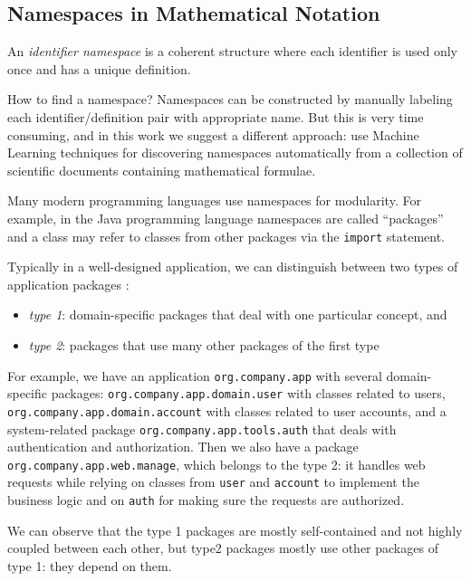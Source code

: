 \subsection{Namespaces in Mathematical Notation} \label{sec:namespaces}


An \emph{identifier namespace} is a coherent structure where
each identifier is used only once and has a unique definition.

How to find a namespace? Namespaces can be constructed by
manually labeling each identifier/definition pair with appropriate
name. But this is very time consuming, and in this work we suggest
a different approach: use Machine Learning techniques for
discovering namespaces automatically from a collection of scientific
documents containing mathematical formulae.


Many modern programming languages use namespaces for modularity.
For example, in the Java programming language \cite{gosling2014java}
namespaces are called ``packages'' and
a class may refer to classes from other packages via the \texttt{import}
statement.



Typically in a well-designed application, we can distinguish between
two types of application packages \cite{evans2004domain}:

\begin{itemize}
  \item \emph{type 1}: domain-specific packages that deal with one particular concept, and
  \item \emph{type 2}: packages that use many other packages of the first type
\end{itemize}


For example, we have an application \verb|org.company.app|
with several domain-specific packages: \verb|org.company.app.domain.user|
with classes related to users, \verb|org.company.app.domain.account|
with classes related to user accounts, and a system-related package
\verb|org.company.app.tools.auth| that deals with authentication and
authorization. Then we also have a package \verb|org.company.app.web.manage|,
which belongs to the type 2: it handles web requests
while relying on classes from \verb|user| and \verb|account| to
implement the business logic and on \verb|auth| for making sure the
requests are authorized.

We can observe that the type 1 packages are mostly self-contained
and not highly coupled between each other,
but type2 packages mostly use other packages of type 1: they
depend on them.

